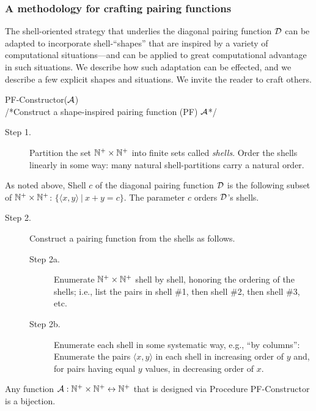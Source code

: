 \subsubsection{A methodology for crafting pairing functions}
\label{sec:build-pair-fn}

The shell-oriented strategy that underlies the diagonal pairing
function $\mbox{$\cal D$}$ can be adapted to incorporate shell-``shapes'' that are
inspired by a variety of computational situations---and can be applied
to great computational advantage in such situations.  We describe how
such adaptation can be effected, and we describe a few explicit shapes
and situations.  We invite the reader to craft others.

\medskip

 {\small\sf PF-Constructor}($\mbox{$\cal A$}$) \\
/*Construct a shape-inspired pairing function (PF) $\mbox{$\cal A$}$*/
\begin{description}
\item[Step 1.]
%
Partition the set $\mathbb{N}^+ \times \mathbb{N}^+$ into finite sets called {\it
  shells}.  Order the shells linearly in some way: many natural
shell-partitions carry a natural order.
\end{description}
As noted above, Shell $c$ of the diagonal pairing function $\mbox{$\cal D$}$ is the
following subset of $\mathbb{N}^+ \times \mathbb{N}^+$: $\{ \langle x,y \rangle \ |
\ x+y = c \}$.  The parameter $c$ orders $\mbox{$\cal D$}$'s shells.

\begin{description}
\item[Step 2.]
Construct a pairing function from the shells as follows.
  \begin{description}
  \item[Step 2a.]
Enumerate $\mathbb{N}^+ \times \mathbb{N}^+$ shell by shell, honoring the ordering of
the shells; i.e., list the pairs in shell \#1, then shell \#2, then
shell \#3, etc.
  \item[Step 2b.]
Enumerate each shell in some systematic way, e.g., ``by columns'':
Enumerate the pairs $\langle x,y \rangle$ in each shell in increasing
order of $y$ and, for pairs having equal $y$ values, in decreasing
order of $x$.
  \end{description}
\end{description}

\begin{prop}
\label{thm:PF-construct}
Any function $\mbox{$\cal A$}: \mathbb{N}^+ \times \mathbb{N}^+ \leftrightarrow \mathbb{N}^+$ that is
designed via Procedure {\small\sf PF-Constructor} is a bijection.
\end{prop}


